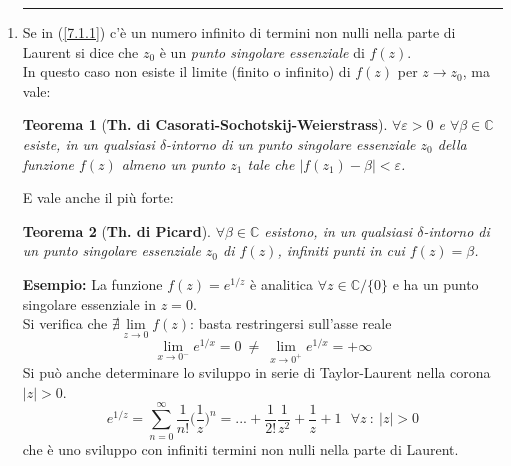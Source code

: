 \documentclass[twoside]{article}
\newtheorem{theorem}{Teorema}[section]
\begin{document}
\begin{enumerate}
\begin{proof}
     \end{proof}
     \textbf{Esempio:} La funzione
     \begin{equation}
         f(z)=\frac{1}{z^2}
     \end{equation}
     analitica in $\mathds{C}/\{0\}$ ha un polo di ordine $2$ in $z=0$, infatti
     \begin{equation}
         \lim_{z \to 0}z^2 f(z)=1
     \end{equation}
     
     \item 
     \rule{\textwidth}{0.7pt}
     Se in (\ref{7.1.1}) c'è un numero infinito di termini non nulli nella parte di Laurent si dice che $z_0$ è un \textit{punto singolare essenziale} di $f(z)$.
     \\
     In questo caso non esiste il limite (finito o infinito) di $f(z)$ per $z \to z_0$, ma vale:
     \begin{theorem}[\textbf{Th. di Casorati-Sochotskij-Weierstrass}]
     $\forall \varepsilon>0$ e $\forall \beta \in \mathds{C}$ esiste, in un qualsiasi $\delta$-intorno di un punto singolare essenziale $z_0$ della funzione $f(z)$ almeno un punto $z_1$ tale che $|f(z_1)-\beta|<\varepsilon$.
     \end{theorem}
     E vale anche il più forte:
     \begin{theorem}[\textbf{Th. di Picard}]
     $\forall \beta \in \mathds{C}$ esistono, in un qualsiasi $\delta$-intorno di un punto singolare essenziale $z_0$ di $f(z)$, infiniti punti in cui $f(z)=\beta$.
     \end{theorem}
     \textbf{Esempio:} La funzione $f(z)=e^{1/z}$ è analitica $\forall z \in \mathds{C}/\{0\}$ e ha un punto singolare essenziale in $z=0$.
     \\
     Si verifica che $\nexists \lim\limits_{z \to 0}f(z)$: basta restringersi sull'asse reale 
     \begin{equation}
         \lim_{x\to 0^-}e^{1/x}=0 \ \ne \ \lim_{x\to 0^+}e^{1/x}=+\infty
     \end{equation}
     Si può anche determinare lo sviluppo in serie di Taylor-Laurent nella corona $|z|>0$.
     \begin{equation}
         e^{1/z}=\sum_{n=0}^{\infty}\frac{1}{n!}\biggl( \frac{1}{z} \biggr)^n=...+\frac{1}{2!}\frac{1}{z^2}+\frac{1}{z}+1 \ \ \ \forall z \ : \ |z|>0
     \end{equation}
     che è uno sviluppo con infiniti termini non nulli nella parte di Laurent.
\end{enumerate}
\end{document}
